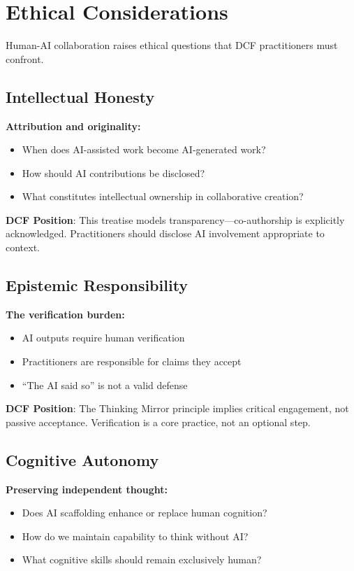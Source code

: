 \chapter{Ethical Considerations}

Human-AI collaboration raises ethical questions that DCF practitioners must confront.

\section{Intellectual Honesty}

\textbf{Attribution and originality:}
\begin{itemize}
    \item When does AI-assisted work become AI-generated work?
    \item How should AI contributions be disclosed?
    \item What constitutes intellectual ownership in collaborative creation?
\end{itemize}

\textbf{DCF Position}: This treatise models transparency---co-authorship is explicitly acknowledged. Practitioners should disclose AI involvement appropriate to context.

\section{Epistemic Responsibility}

\textbf{The verification burden:}
\begin{itemize}
    \item AI outputs require human verification
    \item Practitioners are responsible for claims they accept
    \item ``The AI said so'' is not a valid defense
\end{itemize}

\textbf{DCF Position}: The Thinking Mirror principle implies critical engagement, not passive acceptance. Verification is a core practice, not an optional step.

\section{Cognitive Autonomy}

\textbf{Preserving independent thought:}
\begin{itemize}
    \item Does AI scaffolding enhance or replace human cognition?
    \item How do we maintain capability to think without AI?
    \item What cognitive skills should remain exclusively human?
\end{itemize}

